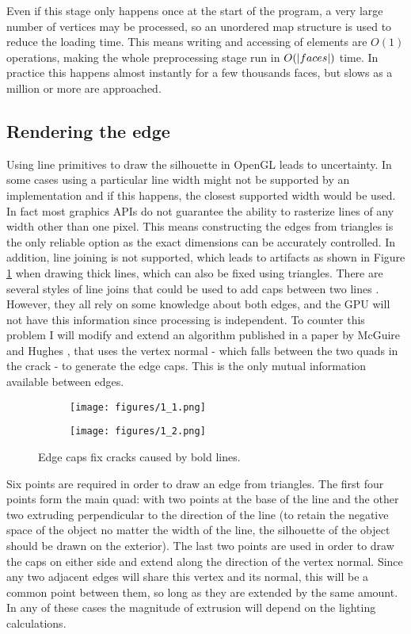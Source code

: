 \documentclass[a4paper,10pt]{article}
\DeclarePairedDelimiter{\abs}{\lvert}{\rvert}
\begin{document}
Even if this stage only happens once at the start of the program, a very large number of vertices may be processed, so an unordered map structure is used to reduce the loading time. This means writing and accessing of elements are $O(1)$ operations, making the whole preprocessing stage run in $O(\abs{faces})$ time. In practice this happens almost instantly for a few thousands faces, but slows as a million or more are approached.


\subsection{Rendering the edge}
Using line primitives to draw the silhouette in OpenGL leads to uncertainty. In some cases using a particular line width might not be supported by an implementation and if this happens, the closest supported width would be used. In fact most graphics APIs do not guarantee the ability to rasterize lines of any width other than one pixel. This means constructing the edges from triangles is the only reliable option as the exact dimensions can be accurately controlled. In addition, line joining is not supported, which leads to artifacts as shown in Figure \ref{cap} when drawing thick lines, which can also be fixed using triangles. There are several styles of line joins that could be used to add caps between two lines \cite{Drakos1999}. However, they all rely on some knowledge about both edges, and the GPU will not have this information since processing is independent. To counter this problem I will modify and extend an algorithm published in a paper by McGuire and Hughes \cite{Hughes2004}, that uses the vertex normal - which falls between the two quads in the crack - to generate the edge caps. This is the only mutual information available between edges.

\begin{figure}[htbp!]
  \centering
  \begin{subfigure}{0.2\columnwidth}
    \texttt{[image: figures/1\_1.png]}
  \end{subfigure}
  \begin{subfigure}{0.2\columnwidth}
    \texttt{[image: figures/1\_2.png]}
  \end{subfigure}
  \caption{Edge caps fix cracks caused by bold lines.}
  \label{cap}
\end{figure}

Six points are required in order to draw an edge from triangles. The first four points form the main quad: with two points at the base of the line and the other two extruding perpendicular to the direction of the line (to retain the negative space of the object no matter the width of the line, the silhouette of the object should be drawn on the exterior). The last two points are used in order to draw the caps on either side and extend along the direction of the vertex normal. Since any two adjacent edges will share this vertex and its normal, this will be a common point between them, so long as they are extended by the same amount. In any of these cases the magnitude of extrusion will depend on the lighting calculations.
\end{document}
